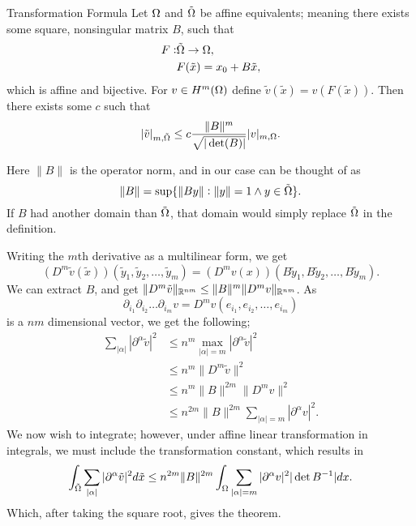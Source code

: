 \begin{thmx}{Transformation Formula\label{thm:transformation}}
    Let $\Omega$ and $\tilde{\Omega}$ be affine equivalents; meaning 
    there exists some square, nonsingular matrix $B$, such that 
    \begin{align*}
        F:&\tilde{\Omega}\to \Omega, \\
        & F(\tilde{x}) = x_0 + B\tilde{x},
    \end{align*}
    which is affine and bijective. For $v\in H^m(\Omega)$ define 
    $\tilde{v}(\tilde{x}) = v(F(\tilde{x}))$.
    Then there exists some $c$ such that 
    \begin{equation*}
        |\tilde{v}|_{m,\tilde{\Omega}} \leq 
        c \frac{\|B\|^m }{\sqrt{|\det(B)|}}|v|_{m,\Omega}.
    \end{equation*}
\end{thmx}
Here $\|B\|$ is the operator norm, and in our case can be thought of 
as 
\begin{equation*}
    \|B\| = \sup\{ \| By\| :\|y\| = 1 \land y \in \tilde{\Omega} \}.
\end{equation*}
If $B$ had another domain than $\tilde{\Omega}$, that domain would simply 
replace $\tilde{\Omega}$ in the definition.
\begin{bev}
   Writing the $m$th derivative as a multilinear form, we get 
   \begin{equation*}
    (D^m\tilde{v}(\tilde{x}))(\tilde{y}_1, \tilde{y}_2, \ldots, \tilde{y}_m )=
    (D^m v(x))(B\tilde{y}_1, B\tilde{y}_2, \ldots, B\tilde{y}_m ).
   \end{equation*} 
We can extract $B$, and get $\|D^m \tilde{v}\|_{\mathbb{R}^{nm}} \leq \|B\|^m \|D^m v\|_{\mathbb{R}^{nm}}$.
As 
$$\partial_{i_{1}}\partial_{i_{2}}\ldots \partial_{i_{m}} v = D^m v(e_{i_1},e_{i_2}, \ldots, e_{i_m})$$
is a $nm$ dimensional vector, we get the following;
\begin{align*}
    \sum_{|\alpha|} | \partial ^\alpha \tilde{v} |^2 & \leq n^m \max_{|\alpha|=m} |\partial ^\alpha \tilde{v}|^2 \\
    &\leq n^m \|D^m\tilde{v}\|^2 \\
    &\leq n^m \|B\|^{2m}\|D^m v\|^2 \\
    &\leq n^{2m}\|B\|^{2m} \sum_{|\alpha|=m}|\partial ^\alpha v|^2.
\end{align*}
We now wish to integrate; however, under affine linear transformation in integrals, 
we must include the transformation constant, which results in 
\begin{equation*}
    \int_{\tilde{\Omega}} \sum_{|\alpha|} | \partial ^\alpha \tilde{v} |^2 d\tilde{x}
    \leq n^{2m}\|B\|^{2m}\int_{\Omega} \sum_{|\alpha|=m}|\partial ^\alpha v|^2 |\det B^{-1}| dx.
\end{equation*}
Which, after taking the square root, gives the theorem.
\end{bev}